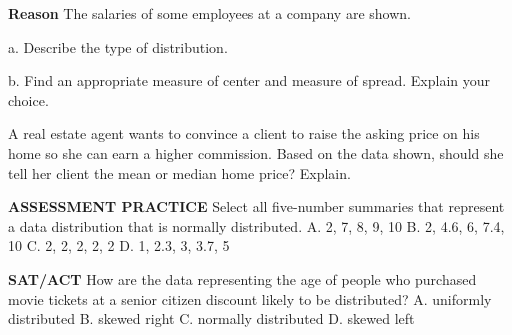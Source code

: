 \documentclass{article}
\newenvironment{practice}[2]{}{}        %
\newcommand{\answer}[1]{}               %
\newcommand{\placeholder}[2]{}          %
\begin{document}
\begin{practice}{27}{2}
\textbf{Reason} The salaries of some employees at a company are shown.
\placeholder{illustration}{Employee Salary: two rows of four colored employee portraits. Top row salaries left to right \$40,000, \$50,000, \$75,000, \$175,000. Bottom row \$55,000, \$90,000, \$100,000, \$60,000.}
a. Describe the type of distribution.
\answer{a. The distribution is skewed right with a large outlier.}
b. Find an appropriate measure of center and measure of spread. Explain your choice.
\answer{b. center = median: \$67,500; spread = interquartile range: \$42,500; Use these because the distribution is skewed.}
\end{practice}
\begin{practice}{28}{2}
A real estate agent wants to convince a client to raise the asking price on his home so she can earn a higher commission. Based on the data shown, should she tell her client the mean or median home price? Explain.
\placeholder{graph}{Residential Prices histogram on an illustration of a row of houses. Horizontal Prices (Thousands of Dollars), bins 100-149,150-199,200-249,250-299,300-349,350-399,400-449,450-499,500-549,550-599. Vertical Number of Homes 0 through 15 labeled every 3. Teal bars have heights approximately 8,12,11,10,7,7,5,4,2,1. No arrows.}
\answer{This distribution is skewed right. That means that the median price will be less than the mean, so the real estate agent should report the mean to encourage her client to increase the asking price.}
\end{practice}
\begin{practice}{29}{1}
\textbf{ASSESSMENT PRACTICE} Select all five-number summaries that represent a data distribution that is normally distributed.
A. 2, 7, 8, 9, 10
B. 2, 4.6, 6, 7.4, 10
C. 2, 2, 2, 2, 2
D. 1, 2.3, 3, 3.7, 5
\answer{B, D}
\end{practice}
\begin{practice}{30}{1}
\textbf{SAT/ACT} How are the data representing the age of people who purchased movie tickets at a senior citizen discount likely to be distributed?
A. uniformly distributed
B. skewed right
C. normally distributed
D. skewed left
\answer{B}
\end{practice}
\end{document}
